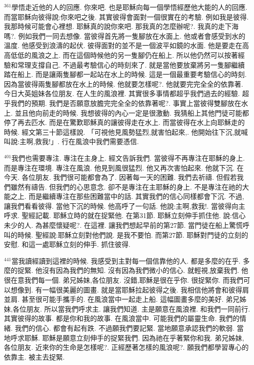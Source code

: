 \documentclass{book}
\begin{document}
$^{361}$學悟走近他的人的回應.
你來吧.
也是耶穌向每一個學悟經歷他大能的人的回應.
而當耶穌向彼得說:你來吧之後.
其實彼得會面對一個很實在的考驗.
例如我是彼得.
我那時候可能會心裡想.
耶穌真的說你來吧.
那我真的怎麼辦呢?.
我真的走下海嗎?.
例如我們一同去想像.
當彼得首先將一隻腳放在水面上.
他或者會感受到水的溫度.
他感受到浪濤的起伏.
彼得面對的並不是一個波平如鏡的水面.
他是要走在高高低低的風浪之上.
而在這個時候他的另一隻腳仍在船上.
所以他仍然可以按著經驗和常理支撐自己.
不過最考驗信心的時刻來了.
就是當他要放棄將另一隻腳繼續踏在船上.
而是讓兩隻腳都一起站在水上的時候.
這是一個最重要考驗信心的時刻.
因為當彼得兩隻腳都放在水上的時候.
他就要怎樣呢?.
他就要完完全全的依靠著.
今日大英姐妹各位朋友.
在人生的風浪裡.
其實很多事情都超乎我們過去的經驗.
超乎我們的預期.
我們是否願意放膽完完全全的依靠著呢?.
事實上當彼得雙腳放在水上.
並且他向前走的時候.
我想彼得的內心一定是很激動.
我猜船上其他門徒可能都停了再去匹水.
而是在驚歎耶穌真的讓彼得走在水上.
而當彼得在水上向耶穌走的時候.
經文第三十節這樣說.
「可視他見風勢猛烈,就害怕起來,.
他開始往下沉,就喊叫說:主啊,救我!」.
行在風浪中我們需要憑信.

$^{401}$我們也需要專注.
專注在主身上.
經文告訴我們.
當彼得不再專注在耶穌的身上.
而是專注在環境.
專注在風浪.
他見到風很猛烈.
他又再次害怕起來.
他就下沉.
在今天.
各位朋友.
我們很可能都會為了.
因著每一天的困難.
我們去祈禱.
但假若我們雖然有禱告.
但我們的心思意念.
卻不是專注在主耶穌的身上.
不是專注在祂的大能之上.
而是繼續專注在那些困難當中的話.
其實我們的信心同樣都會下沉.
不過,讓我們看看彼得.
當他下沉的時候.
他高呼了一句話.
他說:主啊,救我!.
當彼得向主呼求.
聖經記載.
耶穌立時的就在捉緊他.
在第31節.
耶穌立刻伸手抓住他.
說:信心未少的人.
為甚麼懷疑呢?.
在這裡.
讓我們想起早前的第27節.
當門徒在船上驚慌呼叫的時候.
聖經說:耶穌立刻對他們說.
是我不要怕.
而第27節.
耶穌對門徒的立刻的安慰.
和這一處耶穌立刻的伸手.
抓住彼得.

$^{441}$當我讀經讀到這裡的時候.
我感受到主對每一個信靠他的人.
都是多麼的在乎.
多麼的捉緊.
他沒有因為我們的無知.
沒有因為我們微小的信心.
就輕視,放棄我們.
他很在意我們每一個.
弟兄姊妹,各位朋友.
沒錯,耶穌是很在乎你.
很捉緊你.
而我們可以想像到.
有一幅很美麗的圖畫.
就是當耶穌拉起彼得之後.
我相信他將會和彼得肩並肩.
甚至很可能手攜手的.
在風浪當中一起走上船.
這幅圖畫多麼的美好.
弟兄姊妹,各位朋友.
所以當我們呼求主.
讓我們知道.
主是願意在風浪裡.
和我們一同前行.
其實彼得的故事.
都是你和我的故事.
在風浪當中.
可能我們的屬靈生命.
我們的情緒.
我們的信心.
都會有起有跌.
不過願我們要記緊.
當地願意承認我們的軟弱.
當地呼求耶穌.
耶穌是願意立刻伸手的捉緊我們.
因為祂在乎著緊你和我.
弟兄姊妹,各位朋友.
近來你的生命是怎樣呢?.
正經歷著怎樣的風浪呢?.
願我們都學習專心的依靠主.
被主去捉緊.
\end{document}
